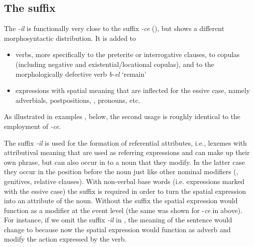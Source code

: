 
\subsection{The suffix }
\label{ssec:The -il attributive}

The  \textit{-il} is functionally very close to the suffix \textit{-ce} (), but shows a different morphosyntactic distribution. It is added to 
\begin{itemize}
	\item verbs, more specifically to the preterite or interrogative clauses, to copulas (including negative and existential\slash locational copulas), and to the morphologically defective verb \textit{b-el} `remain'
	\item expressions with spatial meaning that are inflected for the essive case, namely adverbials, postpositions, , pronouns, etc.
\end{itemize}

As illustrated in examples ,  below, the second usage is roughly identical to the employment of \textit{-ce}. 

The suffix \textit{-il} is used for the formation of referential attributes, i.e., lexemes with attributival meaning that are used as referring expressions and can make up their own phrase, but can also occur in  to a noun that they modify. In the latter case they occur in the position before the noun just like other nominal modifiers (, genitives, relative clauses). With non-verbal base words (i.e. expressions marked with the essive case) the suffix is required in order to turn the spatial expression into an attribute of the noun. Without the suffix the spatial expression would function as a modifier at the event level (the same was shown for -\textit{ce} in  above). For instance, if we omit the suffix \textit{-il} in , the meaning of the sentence would change to  because now the spatial expression would function as adverb and modify the action expressed by the verb.

